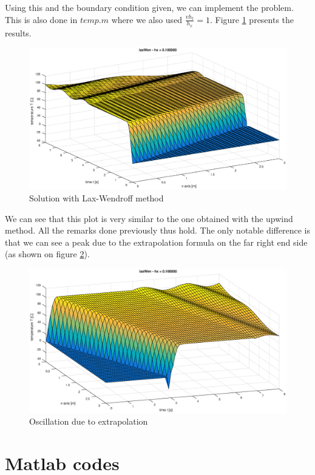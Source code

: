 Using this and the boundary condition given, we can implement the problem. This is also done in $temp.m$ where we also used $\frac{vh_t}{h_x}=1$. Figure \ref{lw} presents the results. 

\begin{figure}
\begin{center}
\includegraphics[scale=0.4]{laxWen.eps}
\caption{Solution with Lax-Wendroff method}
\label{lw}
\end{center}
\end{figure}

We can see that this plot is very similar to the one obtained with the upwind method. All the remarks done previously thus hold. The only notable difference is that we can see a peak due to the extrapolation formula on the far right end side (as shown on figure \ref{trois}).

\begin{figure}
\begin{center}
\includegraphics[scale=0.4]{fig3.eps}
\caption{Oscillation due to extrapolation}
\label{trois}
\end{center}
\end{figure}

\FloatBarrier

\section*{Matlab codes}


